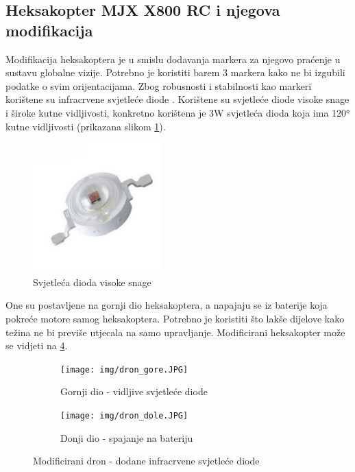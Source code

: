 \documentclass[times, utf8, diplomski]{fer}
\begin{document}
\subsection{Heksakopter MJX X800 RC i njegova modifikacija}\label{sec:heksakopter}
Modifikacija heksakoptera je u smislu dodavanja markera za njegovo praćenje u sustavu globalne vizije. Potrebno je koristiti barem 3 markera kako ne bi izgubili podatke o svim orijentacijama. Zbog robusnosti i stabilnosti kao markeri korištene su infracrvene  svjetleće diode . Korištene su svjetleće diode visoke snage i široke kutne vidljivosti, konkretno korištena je 3W svjetleća dioda koja ima \ang{120} kutne vidljivosti (prikazana slikom \ref{fig:LED}). \\
\begin{figure}[htb]
\centering
\includegraphics[width=5cm]{img/LED.png}
\caption{Svjetleća dioda visoke snage\protect\footnotemark}
\label{fig:LED}
\end{figure}
One su postavljene na gornji dio heksakoptera, a napajaju se iz baterije koja pokreće motore samog heksakoptera. Potrebno je koristiti što lakše dijelove kako težina ne bi previše utjecala na samo upravljanje. Modificirani heksakopter može se vidjeti na \ref{fig:modificirani dron}.
\begin{figure}[htb]
\centering
\begin{subfigure}{.48\textwidth}
  \centering
  \texttt{[image: img/dron\_gore.JPG]}
  \caption{Gornji dio - vidljive svjetleće diode}
  \label{fig:gornji}
\end{subfigure}
\begin{subfigure}{.48\textwidth}
  \centering
  \texttt{[image: img/dron\_dole.JPG]}
  \caption{Donji dio - spajanje na bateriju}
  \label{fig:donji}
\end{subfigure}
\caption{Modificirani dron - dodane infracrvene svjetleće diode}
\label{fig:modificirani dron}
\end{figure}
\end{document}
